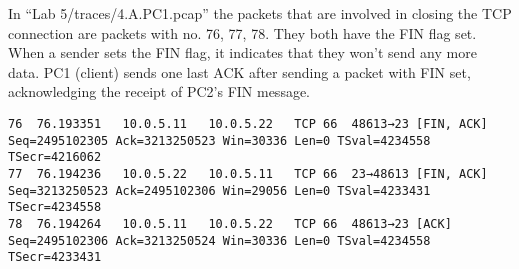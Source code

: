 
In ``Lab 5/traces/4.A.PC1.pcap'' the packets that are involved in closing the TCP connection are packets with no. 76, 77, 78.
They both have the FIN flag set. \\
When a sender sets the FIN flag, it indicates that they won't send any more data.
PC1 (client) sends one last ACK after sending a packet with FIN set, acknowledging the receipt of PC2's FIN message.

\begin{lstlisting}
76	76.193351	10.0.5.11	10.0.5.22	TCP	66	48613→23 [FIN, ACK] Seq=2495102305 Ack=3213250523 Win=30336 Len=0 TSval=4234558 TSecr=4216062
77	76.194236	10.0.5.22	10.0.5.11	TCP	66	23→48613 [FIN, ACK] Seq=3213250523 Ack=2495102306 Win=29056 Len=0 TSval=4233431 TSecr=4234558
78	76.194264	10.0.5.11	10.0.5.22	TCP	66	48613→23 [ACK] Seq=2495102306 Ack=3213250524 Win=30336 Len=0 TSval=4234558 TSecr=4233431
\end{lstlisting}
